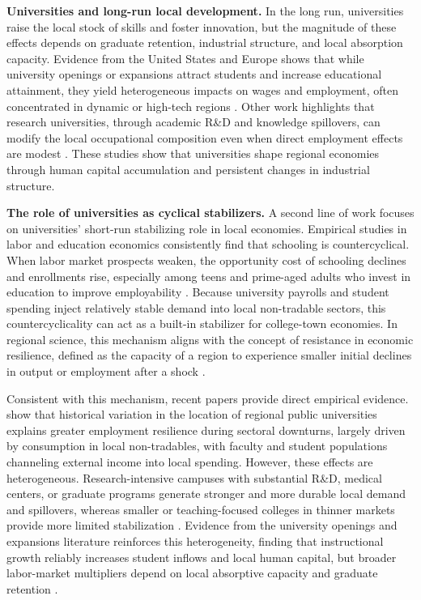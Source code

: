 \noindent \textbf{Universities and long-run local development.} In the long run, universities raise the local stock of skills and foster innovation, but the magnitude of these effects depends on graduate retention, industrial structure, and local absorption capacity. Evidence from the United States and Europe shows that while university openings or expansions attract students and increase educational attainment, they yield heterogeneous impacts on wages and employment, often concentrated in dynamic or high-tech regions \citep{berlingieriCollegeOpeningsLocal2022,ferhatImpactUniversityOpenings,amendolaDoesGraduateHuman2020,abelCollegesUniversitiesIncrease2012}. Other work highlights that research universities, through academic R\&D and knowledge spillovers, can modify the local occupational composition even when direct employment effects are modest \citep{beesonEffectsCollegesUniversities,harrisUniversitiesAnchorInstitutions2016}. These studies show that universities shape regional economies through human capital accumulation and persistent changes in industrial structure.

\noindent \textbf{The role of universities as cyclical stabilizers.} A second line of work focuses on universities’ short-run stabilizing role in local economies. Empirical studies in labor and education economics consistently find that schooling is countercyclical. When labor market prospects weaken, the opportunity cost of schooling declines and enrollments rise, especially among teens and prime-aged adults who invest in education to improve employability \citep{dellasBusinessCyclesSchooling2003,bettsSafePortStorm1995}. Because university payrolls and student spending inject relatively stable demand into local non-tradable sectors, this countercyclicality can act as a built-in stabilizer for college-town economies. In regional science, this mechanism aligns with the concept of resistance in economic resilience, defined as the capacity of a region to experience smaller initial declines in output or employment after a shock \citep{martinNotionRegionalEconomic2015,martinRegionalEconomicResilience2012}.

Consistent with this mechanism, recent papers provide direct empirical evidence. \citet{howardUniversitiesImproveLocal2024} show that historical variation in the location of regional public universities explains greater employment resilience during sectoral downturns, largely driven by consumption in local non-tradables, with faculty and student populations channeling external income into local spending. However, these effects are heterogeneous. Research-intensive campuses with substantial R\&D, medical centers, or graduate programs generate stronger and more durable local demand and spillovers, whereas smaller or teaching-focused colleges in thinner markets provide more limited stabilization \citep{howardUniversitiesImproveLocal2024,beesonEffectsCollegesUniversities}. Evidence from the university openings and expansions literature reinforces this heterogeneity, finding that instructional growth reliably increases student inflows and local human capital, but broader labor-market multipliers depend on local absorptive capacity and graduate retention \citep{berlingieriCollegeOpeningsLocal2022,ferhatImpactUniversityOpenings,amendolaDoesGraduateHuman2020}.

